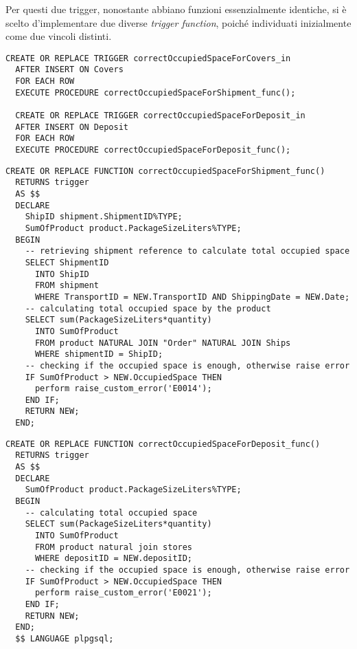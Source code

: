 Per questi due trigger, nonostante abbiano funzioni essenzialmente identiche, si è scelto d'implementare due diverse \textit{trigger function}, poiché individuati inizialmente come due vincoli distinti.

\begin{lstlisting}[caption={Trigger per i vincoli \textbf{correctOccupiedSpaceForShipment} e \textbf{correctOccupiedSpaceForDeposit}}]
  CREATE OR REPLACE TRIGGER correctOccupiedSpaceForCovers_in
  AFTER INSERT ON Covers
  FOR EACH ROW
  EXECUTE PROCEDURE correctOccupiedSpaceForShipment_func();

  CREATE OR REPLACE TRIGGER correctOccupiedSpaceForDeposit_in
  AFTER INSERT ON Deposit
  FOR EACH ROW
  EXECUTE PROCEDURE correctOccupiedSpaceForDeposit_func();
\end{lstlisting}

\begin{lstlisting}[caption={Funzione per il vincolo \textbf{correctOccupiedSpaceForShipment}}]
  CREATE OR REPLACE FUNCTION correctOccupiedSpaceForShipment_func() 
  RETURNS trigger
  AS $$
  DECLARE
    ShipID shipment.ShipmentID%TYPE;
    SumOfProduct product.PackageSizeLiters%TYPE;
  BEGIN
    -- retrieving shipment reference to calculate total occupied space
    SELECT ShipmentID
      INTO ShipID
      FROM shipment
      WHERE TransportID = NEW.TransportID AND ShippingDate = NEW.Date;
    -- calculating total occupied space by the product
    SELECT sum(PackageSizeLiters*quantity)
      INTO SumOfProduct
      FROM product NATURAL JOIN "Order" NATURAL JOIN Ships
      WHERE shipmentID = ShipID;
    -- checking if the occupied space is enough, otherwise raise error
    IF SumOfProduct > NEW.OccupiedSpace THEN
      perform raise_custom_error('E0014');
    END IF;
    RETURN NEW;
  END;
\end{lstlisting}

\begin{lstlisting}[caption={Funzione per il vincolo \textbf{correctOccupiedSpaceForDeposit}}, label={correctOccupiedSpaceForDeposit_func}]
  CREATE OR REPLACE FUNCTION correctOccupiedSpaceForDeposit_func()
  RETURNS trigger
  AS $$
  DECLARE
    SumOfProduct product.PackageSizeLiters%TYPE;
  BEGIN
    -- calculating total occupied space
    SELECT sum(PackageSizeLiters*quantity)
      INTO SumOfProduct
      FROM product natural join stores
      WHERE depositID = NEW.depositID;
    -- checking if the occupied space is enough, otherwise raise error
    IF SumOfProduct > NEW.OccupiedSpace THEN
      perform raise_custom_error('E0021');
    END IF;
    RETURN NEW;
  END;
  $$ LANGUAGE plpgsql;
\end{lstlisting}

